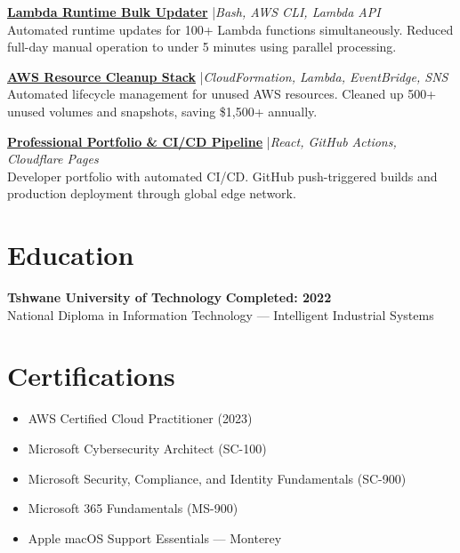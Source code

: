 \documentclass[11pt,a4paper]{article}
\begin{document}
\href{https://github.com/mamathebula/lambda-runtime-updater}{\color{linkblue}\textbf{Lambda Runtime Bulk Updater}} \enspace|\enspace \textit{Bash, AWS CLI, Lambda API}\\
Automated runtime updates for 100+ Lambda functions simultaneously. Reduced full-day manual operation to under 5 minutes using parallel processing.

\href{https://github.com/mamathebula/aws-resource-cleanup}{\color{linkblue}\textbf{AWS Resource Cleanup Stack}} \enspace|\enspace \textit{CloudFormation, Lambda, EventBridge, SNS}\\
Automated lifecycle management for unused AWS resources. Cleaned up 500+ unused volumes and snapshots, saving \$1,500+ annually.

\href{https://applyza.co.za/resume_mandla/}{\color{linkblue}\textbf{Professional Portfolio \& CI/CD Pipeline}} \enspace|\enspace \textit{React, GitHub Actions, Cloudflare Pages}\\
Developer portfolio with automated CI/CD. GitHub push-triggered builds and production deployment through global edge network.

\section{Education}
\textbf{Tshwane University of Technology} \hfill \textbf{Completed: 2022}\\
National Diploma in Information Technology --- Intelligent Industrial Systems

\section{Certifications}
\begin{itemize}
  \item AWS Certified Cloud Practitioner (2023)
  \item Microsoft Cybersecurity Architect (SC-100)
  \item Microsoft Security, Compliance, and Identity Fundamentals (SC-900)
  \item Microsoft 365 Fundamentals (MS-900)
  \item Apple macOS Support Essentials --- Monterey
\end{itemize}

\end{document}
